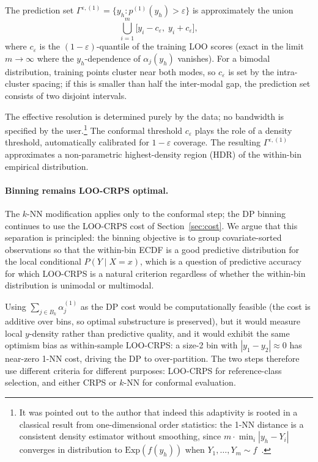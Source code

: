 \documentclass[11pt]{article}
\begin{document}
The prediction set $\Gamma^{\varepsilon,(1)} = \{y_h : p^{(1)}(y_h) > \varepsilon\}$ is
approximately the union
\[
  \bigcup_{i=1}^m\bigl[y_i - c_\varepsilon,\;y_i + c_\varepsilon\bigr],
\]
where $c_\varepsilon$ is the $(1-\varepsilon)$-quantile of the training LOO scores
(exact in the limit $m \to \infty$ where the $y_h$-dependence of $\alpha_j(y_h)$
vanishes).
For a bimodal distribution, training points cluster near both modes, so $c_\varepsilon$
is set by the intra-cluster spacing; if this is smaller than half the inter-modal gap,
the prediction set consists of two disjoint intervals.

The effective resolution is determined purely by the data; no bandwidth is specified
by the user.\footnote{It was pointed out to the author that indeed this adaptivity is
rooted in a classical result from
one-dimensional order statistics: the 1-NN distance is a consistent density estimator
without smoothing, since $m \cdot \min_i|y_h - Y_i|$ converges in distribution to
$\mathrm{Exp}(f(y_h))$ when $Y_1,\ldots,Y_m \sim f$~\citep{DevroyeGyorfi1985}.}
The conformal threshold $c_\varepsilon$ plays the role of a density threshold,
automatically calibrated for $1-\varepsilon$ coverage.
The resulting $\Gamma^{\varepsilon,(1)}$ approximates a non-parametric highest-density region
(HDR) of the within-bin empirical distribution.

\paragraph{Binning remains LOO-CRPS optimal.}
The $k$-NN modification applies only to the conformal step; the DP binning continues
to use the LOO-CRPS cost of Section~\ref{sec:cost}.
We argue that this separation is principled: the binning objective is to group covariate-sorted
observations so that the within-bin ECDF is a good predictive distribution for the
local conditional $P(Y \mid X = x)$, which is a question of predictive accuracy for
which LOO-CRPS is a natural criterion regardless of whether the within-bin
distribution is unimodal or multimodal.

Using $\sum_{j \in B_k} \alpha^{(1)}_j$ as the DP cost would be computationally
feasible (the cost is additive over bins, so optimal substructure is preserved), but
it would measure local $y$-density rather than predictive quality, and it would
exhibit the same optimism bias as within-sample LOO-CRPS: a size-2 bin with
$|y_1 - y_2| \approx 0$ has near-zero 1-NN cost, driving the DP to
over-partition.
The two steps therefore use different criteria for different purposes: LOO-CRPS for
reference-class selection, and either CRPS or $k$-NN for conformal evaluation.
\end{document}
